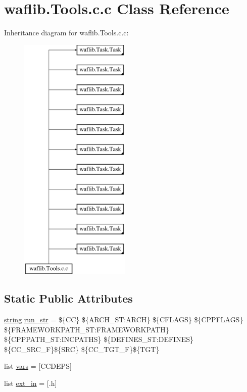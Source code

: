 \hypertarget{classwaflib_1_1_tools_1_1c_1_1c}{}\section{waflib.\+Tools.\+c.\+c Class Reference}
\label{classwaflib_1_1_tools_1_1c_1_1c}
Inheritance diagram for waflib.\+Tools.\+c.\+c\+:\begin{figure}[H]
\begin{center}
\leavevmode
\includegraphics[height=12.000000cm]{classwaflib_1_1_tools_1_1c_1_1c}
\end{center}
\end{figure}
\subsection*{Static Public Attributes}
\begin{DoxyCompactItemize}
\item 
\hyperlink{test__lib_f_l_a_c_2format_8c_ab02026ad0de9fb6c1b4233deb0a00c75}{string} \hyperlink{classwaflib_1_1_tools_1_1c_1_1c_a1a6b4be4617a72003ab4259bd2094812}{run\+\_\+str} = \textquotesingle{}\$\{CC\} \$\{A\+R\+C\+H\+\_\+\+S\+T\+:\+A\+R\+CH\} \$\{C\+F\+L\+A\+GS\} \$\{C\+P\+P\+F\+L\+A\+GS\} \$\{F\+R\+A\+M\+E\+W\+O\+R\+K\+P\+A\+T\+H\+\_\+\+S\+T\+:\+F\+R\+A\+M\+E\+W\+O\+R\+K\+P\+A\+TH\} \$\{C\+P\+P\+P\+A\+T\+H\+\_\+\+S\+T\+:\+I\+N\+C\+P\+A\+T\+HS\} \$\{D\+E\+F\+I\+N\+E\+S\+\_\+\+S\+T\+:\+D\+E\+F\+I\+N\+ES\} \$\{C\+C\+\_\+\+S\+R\+C\+\_\+F\}\$\{S\+RC\} \$\{C\+C\+\_\+\+T\+G\+T\+\_\+F\}\$\{T\+GT\}\textquotesingle{}
\item 
list \hyperlink{classwaflib_1_1_tools_1_1c_1_1c_a76cd04dfeb75c30102069902e33b880c}{vars} = \mbox{[}\textquotesingle{}C\+C\+D\+E\+PS\textquotesingle{}\mbox{]}
\item 
list \hyperlink{classwaflib_1_1_tools_1_1c_1_1c_a467da5df7e22592dc8522e604e51834b}{ext\+\_\+in} = \mbox{[}\textquotesingle{}.h\textquotesingle{}\mbox{]}
\end{DoxyCompactItemize}
